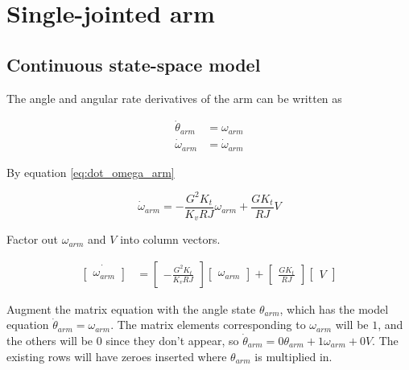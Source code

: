 \section{Single-jointed arm}
\label{sec:ss_model_single-jointed_arm}

\subsection{Continuous state-space model}

The angle and angular rate derivatives of the arm can be written as

\begin{align}
  \dot{\theta}_{arm} &= \omega_{arm} \label{eq:arm_cont_ss_pos} \\
  \dot{\omega}_{arm} &= \dot{\omega}_{arm} \label{eq:arm_cont_ss_vel}
\end{align}

By equation \eqref{eq:dot_omega_arm}

\begin{equation*}
  \dot{\omega}_{arm} = -\frac{G^2 K_t}{K_v RJ} \omega_{arm} + \frac{G K_t}{RJ} V
\end{equation*}

Factor out $\omega_{arm}$ and $V$ into column vectors.

\begin{align*}
  \dot{\begin{bmatrix}
    \omega_{arm}
  \end{bmatrix}} &=
  \begin{bmatrix}
    -\frac{G^2 K_t}{K_v RJ}
  \end{bmatrix}
  \begin{bmatrix}
    \omega_{arm}
  \end{bmatrix} +
  \begin{bmatrix}
    \frac{GK_t}{RJ}
  \end{bmatrix}
  \begin{bmatrix}
    V
  \end{bmatrix}
\end{align*}

Augment the matrix equation with the angle state $\theta_{arm}$, which has the
model equation $\dot{\theta}_{arm} = \omega_{arm}$. The matrix elements
corresponding to $\omega_{arm}$ will be $1$, and the others will be $0$ since
they don't appear, so $\dot{\theta}_{arm} = 0\theta_{arm} + 1\omega_{arm} + 0V$.
The existing rows will have zeroes inserted where $\theta_{arm}$ is multiplied
in.

